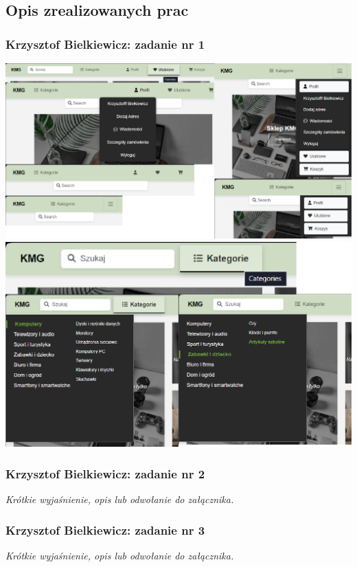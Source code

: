 \documentclass[12pt,a4paper,oneside]{article}
\theoremstyle{definition}
\numberwithin{equation}{section}
\begin{document}
\subsection {Opis zrealizowanych prac}
\subsubsection{Krzysztof Bielkiewicz: zadanie nr 1}
\label{1.3.1}
    \begin{center}
        \centering \includegraphics[width=1.0\columnwidth]{images/header.png}
        \centering \includegraphics[width=1.0\columnwidth]{images/header-categories.png}
    \end{center}

\subsubsection{Krzysztof Bielkiewicz: zadanie nr 2}
\label{1.3.2}
\textit{Krótkie wyjaśnienie, opis lub odwołanie do załącznika.}

\subsubsection{Krzysztof Bielkiewicz: zadanie nr 3}
\label{1.3.3}
\textit{Krótkie wyjaśnienie, opis lub odwołanie do załącznika.}
\end{document}
